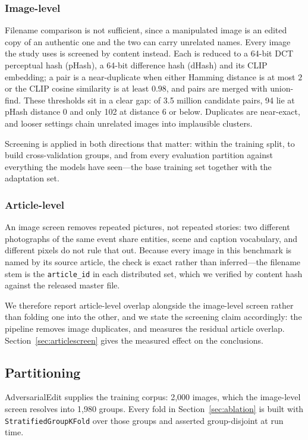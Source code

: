 \documentclass[pdflatex,sn-mathphys-num]{sn-jnl}
\begin{document}
\subsubsection{Image-level}
Filename comparison is not sufficient, since a manipulated image is an edited
copy of an authentic one and the two can carry unrelated names. Every image the
study uses is screened by content instead. Each is reduced to a 64-bit DCT
perceptual hash (pHash), a 64-bit difference hash (dHash) and its CLIP
embedding; a pair is a near-duplicate when either Hamming distance is at most
$2$ or the CLIP cosine similarity is at least $0.98$, and pairs are merged with
union-find. These thresholds sit in a clear gap: of 3.5 million candidate
pairs, 94 lie at pHash distance $0$ and only 102 at distance $6$ or below.
Duplicates are near-exact, and looser settings chain unrelated images into
implausible clusters.

Screening is applied in both directions that matter: within the training split,
to build cross-validation groups, and from every evaluation partition against
everything the models have seen---the base training set together with the
adaptation set.

\subsubsection{Article-level}
\label{sec:articles}
An image screen removes repeated pictures, not repeated stories: two different
photographs of the same event share entities, scene and caption vocabulary, and
different pixels do not rule that out. Because every image in this benchmark is
named by its source article, the check is exact rather than inferred---the
filename stem is the \texttt{article\_id} in each distributed set, which we
verified by content hash against the released master file.

We therefore report article-level overlap alongside the image-level screen
rather than folding one into the other, and we state the screening claim
accordingly: the pipeline removes image duplicates, and measures the residual
article overlap. Section~\ref{sec:articlescreen} gives the measured effect on
the conclusions.

\subsection{Partitioning}
\label{sec:partition}

AdversarialEdit supplies the training corpus: 2{,}000 images, which the
image-level screen resolves into 1{,}980 groups. Every fold in
Section~\ref{sec:ablation} is built with \texttt{StratifiedGroupKFold} over
those groups and asserted group-disjoint at run time.
\end{document}
